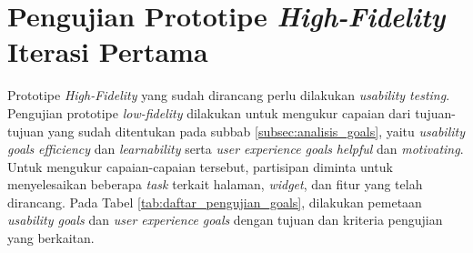 \section{Pengujian Prototipe \textit{High-Fidelity} Iterasi Pertama}
\label{sec:test_1}

Prototipe \textit{High-Fidelity} yang sudah dirancang perlu dilakukan \textit{usability testing}. Pengujian prototipe \textit{low-fidelity} dilakukan untuk mengukur capaian dari tujuan-tujuan yang sudah ditentukan pada subbab \ref{subsec:analisis_goals}, yaitu \textit{usability goals} \textit{efficiency} dan \textit{learnability} serta \textit{user experience goals} \textit{helpful} dan \textit{motivating}. Untuk mengukur capaian-capaian tersebut, partisipan diminta untuk menyelesaikan beberapa \textit{task} terkait halaman, \textit{widget}, dan fitur yang telah dirancang. Pada Tabel \ref{tab:daftar_pengujian_goals}, dilakukan pemetaan \textit{usability goals} dan \textit{user experience goals} dengan tujuan dan kriteria pengujian yang berkaitan.

